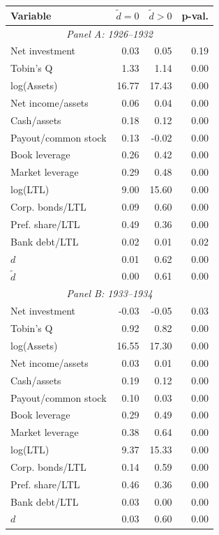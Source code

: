 \begin{threeparttable}
\begin{tabular}{lrrr}
\toprule
Variable & \ensuremath{\tilde{d}=0} & \ensuremath{\tilde{d}>0} & p-val. \\
\midrule
\multicolumn{4}{c}{\textit{Panel A: 1926--1932}} \\
\midrule
Net investment & 0.03 & 0.05 & 0.19 \\
Tobin's Q & 1.33 & 1.14 & 0.00 \\
log(Assets) & 16.77 & 17.43 & 0.00 \\
Net income/assets & 0.06 & 0.04 & 0.00 \\
Cash/assets & 0.18 & 0.12 & 0.00 \\
Payout/common stock & 0.13 & -0.02 & 0.00 \\
Book leverage & 0.26 & 0.42 & 0.00 \\
Market leverage & 0.29 & 0.48 & 0.00 \\
log(LTL) & 9.00 & 15.60 & 0.00 \\
Corp. bonds/LTL & 0.09 & 0.60 & 0.00 \\
Pref. share/LTL & 0.49 & 0.36 & 0.00 \\
Bank debt/LTL & 0.02 & 0.01 & 0.02 \\
\ensuremath{d} & 0.01 & 0.62 & 0.00 \\
\ensuremath{\tilde{d}} & 0.00 & 0.61 & 0.00 \\
\midrule
\multicolumn{4}{c}{\textit{Panel B: 1933--1934}} \\
\midrule
Net investment & -0.03 & -0.05 & 0.03 \\
Tobin's Q & 0.92 & 0.82 & 0.00 \\
log(Assets) & 16.55 & 17.30 & 0.00 \\
Net income/assets & 0.03 & 0.01 & 0.00 \\
Cash/assets & 0.19 & 0.12 & 0.00 \\
Payout/common stock & 0.10 & 0.03 & 0.00 \\
Book leverage & 0.29 & 0.49 & 0.00 \\
Market leverage & 0.38 & 0.64 & 0.00 \\
log(LTL) & 9.37 & 15.33 & 0.00 \\
Corp. bonds/LTL & 0.14 & 0.59 & 0.00 \\
Pref. share/LTL & 0.46 & 0.36 & 0.00 \\
Bank debt/LTL & 0.03 & 0.00 & 0.00 \\
\ensuremath{d} & 0.03 & 0.60 & 0.00 \\

\end{tabular}
\end{threeparttable}
